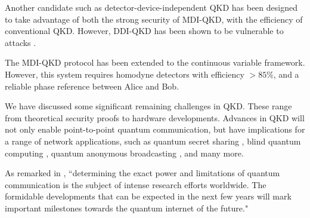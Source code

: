Another candidate such as detector-device-independent \cite{bib:lim2014detector, bib:PhysRevA.92.022337} QKD has been designed to take advantage of both the strong security of MDI-QKD, with the efficiency of conventional QKD. However, DDI-QKD has been shown to be vulnerable to attacks \cite{bib:PhysRevLett.117.250505}. 

The MDI-QKD protocol has been extended to the continuous variable framework. However, this system requires homodyne detectors with efficiency $>85\%$, and a reliable phase reference between Alice and Bob.  

We have discussed some significant remaining challenges in QKD. These range from theoretical security proofs to hardware developments. Advances in QKD will not only enable point-to-point quantum communication, but have implications for a range of network applications, such as quantum secret sharing \cite{bib:cleve1999share, bib:PhysRevA.61.042311, bib:PhysRevA.71.044301}, blind quantum computing \cite{bib:broadbent2009universal, bib:barz2012demonstration}, quantum anonymous broadcasting \cite{bib:christandl2005quantum}, and many more.

As remarked in \cite{bib:diamanti2016practical}, ``determining the exact power and limitations of quantum communication is the subject of intense research efforts worldwide. The formidable developments that can be expected in the next few years will mark important milestones towards the quantum internet of the future." 